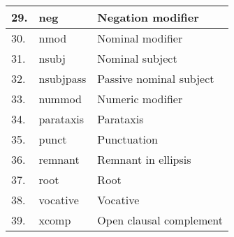 \begin{table}[h]
\begin{tabular}{| l | l | l |}
29. & 	neg  & Negation modifier \\ \hline
30. & 	nmod  & Nominal modifier \\ \hline
31. & 	nsubj  & Nominal subject \\ \hline
32. & 	nsubjpass  & Passive nominal subject \\ \hline
33. & nummod  & Numeric modifier \\ \hline
34. & 	parataxis  & Parataxis  \\ \hline
35. & 	punct  & Punctuation  \\ \hline
36. &  remnant  & Remnant in ellipsis  \\ \hline
37. &  root  & Root  \\ \hline
38. & 	vocative  & Vocative  \\ \hline
39. & 	xcomp  & Open clausal complement  \\ \hline
    \end{tabular}

\end{table}